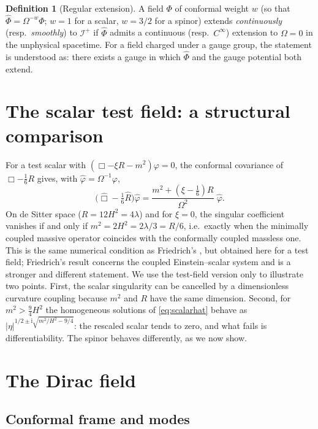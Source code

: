 \documentclass[11pt,a4paper]{article}
\theoremstyle{definition}
\newtheorem{definition}{Definition}
\newcommand{\scri}{\mathscr{I}^{+}}
\newcommand{\ii}{\mathrm{i}}
\newcommand{\hphi}{\hat\varphi}
\begin{document}
\begin{definition}[Regular extension]
A field $\Phi$ of conformal weight $w$ (so that $\hat\Phi=\Omega^{-w}\Phi$; $w=1$ for a scalar, $w=3/2$ for a spinor) extends \emph{continuously} (resp.\ \emph{smoothly}) to $\scri$ if $\hat\Phi$ admits a continuous (resp.\ $C^{\infty}$) extension to $\Omega=0$ in the unphysical spacetime. For a field charged under a gauge group, the statement is understood as: there exists a gauge in which $\hat\Phi$ and the gauge potential both extend.
\end{definition}

\section{The scalar test field: a structural comparison}
\label{sec:scalar}

For a test scalar with $(\Box-\xi R-m^{2})\varphi=0$, the conformal covariance of $\Box-\tfrac16R$ gives, with $\hphi=\Omega^{-1}\varphi$,
\begin{equation}
\Big(\hat\Box-\tfrac16\hat R\Big)\hphi=\frac{m^{2}+(\xi-\tfrac16)R}{\Omega^{2}}\;\hphi .
\label{eq:scalarhat}
\end{equation}
On de Sitter space ($R=12H^{2}=4\lambda$) and for $\xi=0$, the singular coefficient vanishes if and only if $m^{2}=2H^{2}=2\lambda/3=R/6$, i.e.\ exactly when the minimally coupled massive operator coincides with the conformally coupled massless one. This is the same numerical condition as Friedrich's \cite{Friedrich2014}, but obtained here for a test field; Friedrich's result concerns the coupled Einstein--scalar system and is a stronger and different statement. We use the test-field version only to illustrate two points. First, the scalar singularity can be cancelled by a dimensionless curvature coupling because $m^{2}$ and $R$ have the same dimension. Second, for $m^{2}>\tfrac94H^{2}$ the homogeneous solutions of \eqref{eq:scalarhat} behave as $|\eta|^{1/2\pm\ii\sqrt{m^{2}/H^{2}-9/4}}$: the rescaled scalar tends to zero, and what fails is differentiability. The spinor behaves differently, as we now show.

\section{The Dirac field}
\label{sec:dirac}

\subsection{Conformal frame and modes}
\label{sec:modes}
\end{document}
